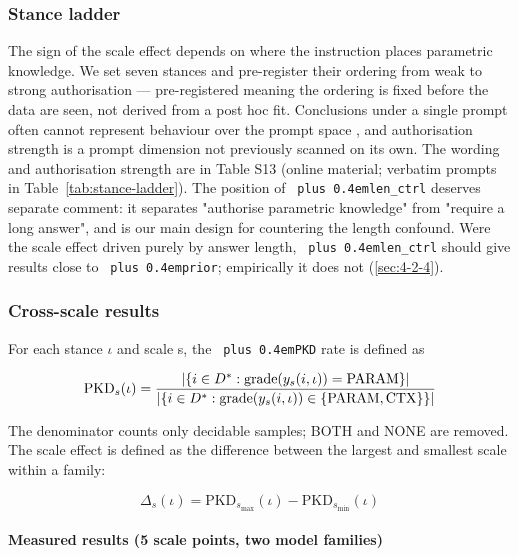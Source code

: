 \documentclass[pdflatex,sn-basic,Numbered]{sn-jnl}
\theoremstyle{thmstyleone}
\theoremstyle{thmstyletwo}
\theoremstyle{thmstylethree}
\DeclareRobustCommand{\code}[1]{\texttt{\spaceskip=0pt plus 0.4em\relax#1}}
\begin{document}
\subsubsection{Stance ladder}
\label{sec:4-2-2}

The sign of the scale effect depends on where the instruction places parametric knowledge. We
set seven stances and pre-register their ordering from weak to strong authorisation —
pre-registered meaning the ordering is fixed before the data are seen, not derived from a post
hoc fit. Conclusions under a single prompt often cannot represent behaviour over the prompt
space \cite{ref39,ref38}, and authorisation strength is a prompt dimension not previously scanned on its
own. The wording and authorisation strength are in Table S13 (online material; verbatim
prompts in Table~\ref{tab:stance-ladder}). The position of \code{len\_ctrl} deserves separate
comment: it separates "authorise parametric knowledge" from "require a long answer", and is our
main design for countering the length confound. Were the scale effect driven purely by answer
length, \code{len\_ctrl} should give results close to \code{prior}; empirically it does not (\ref{sec:4-2-4}).

\subsubsection{Cross-scale results}
\label{sec:4-2-3}

For each stance $\iota$ and scale s, the \code{PKD} rate is defined as

\begin{equation*}
  \resizebox{\ifdim\width>\linewidth \linewidth\else\width\fi}{!}{$\displaystyle \text{PKD}_s(\iota) = \frac{\left|\{i \in D^* : \text{grade}(y_s(i,\iota)) = \text{PARAM}\}\right|}{\left|\{i \in D^* : \text{grade}(y_s(i,\iota)) \in \{\text{PARAM}, \text{CTX}\}\}\right|}$}
\end{equation*}

The denominator counts only decidable samples; BOTH and NONE are removed. The scale effect is
defined as the difference between the largest and smallest scale within a family:

\begin{equation}
  \Delta_s(\iota) = \text{PKD}_{s_{\max}}(\iota) - \text{PKD}_{s_{\min}}(\iota)
\end{equation}

\paragraph{Measured results (5 scale points, two model families)}
\label{sec:4-2-3-1}
\end{document}

